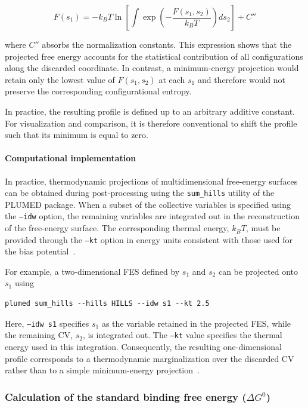 \begin{equation}
F(s_1) = -k_B T \ln \left[ \int \exp\left( -\frac{F(s_1,s_2)}{k_B T} \right) ds_2 \right] +C''
\end{equation}

where $C''$ absorbs the normalization constants. This expression shows that the projected free energy accounts for the statistical contribution of all configurations along the discarded coordinate. In contrast, a minimum-energy projection would retain only the lowest value of $F(s_1,s_2)$ at each $s_1$ and therefore would not preserve the corresponding configurational entropy.

In practice, the resulting profile is defined up to an arbitrary additive constant. For visualization and comparison, it is therefore conventional to shift the profile such that its minimum is equal to zero.


\paragraph{Computational implementation}

In practice, thermodynamic projections of multidimensional free-energy surfaces can be obtained during post-processing using the \texttt{sum\_hills} utility of the PLUMED package. When a subset of the collective variables is specified using the \texttt{--idw} option, the remaining variables are integrated out in the reconstruction of the free-energy surface. The corresponding thermal energy, $k_B T$, must be provided through the \texttt{--kt} option in energy units consistent with those used for the bias potential~\cite{plumed}.

For example, a two-dimensional FES defined by $s_1$ and $s_2$ can be projected onto $s_1$ using

\begin{verbatim}
plumed sum_hills --hills HILLS --idw s1 --kt 2.5
\end{verbatim}

Here, \texttt{--idw s1} specifies $s_1$ as the variable retained in the projected FES, while the remaining CV, $s_2$, is integrated out. The \texttt{--kt} value specifies the thermal energy used in this integration. Consequently, the resulting one-dimensional profile corresponds to a thermodynamic marginalization over the discarded CV rather than to a simple minimum-energy projection~\cite{plumed}.




\subsubsection{Calculation of the standard binding free energy ($\Delta G^0$)}

